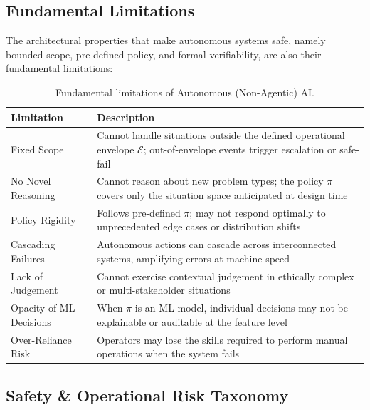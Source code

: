 \documentclass[12pt, a4paper]{article}
\begin{document}
\subsection{Fundamental Limitations}
The architectural properties that make autonomous systems safe, namely bounded scope, pre-defined policy, and formal verifiability, are also their fundamental limitations:

\begin{table}[ht]
\centering
\caption{Fundamental limitations of Autonomous (Non-Agentic) AI.}
\label{tab:limitations}
\begin{tabular}{p{3.5cm}p{9.5cm}}
\toprule
\textbf{Limitation} & \textbf{Description} \\
\midrule
Fixed Scope & Cannot handle situations outside the defined operational envelope $\mathcal{E}$; out-of-envelope events trigger escalation or safe-fail \\
No Novel Reasoning & Cannot reason about new problem types; the policy $\pi$ covers only the situation space anticipated at design time \\
Policy Rigidity & Follows pre-defined $\pi$; may not respond optimally to unprecedented edge cases or distribution shifts \\
Cascading Failures & Autonomous actions can cascade across interconnected systems, amplifying errors at machine speed \\
Lack of Judgement & Cannot exercise contextual judgement in ethically complex or multi-stakeholder situations \\
Opacity of ML Decisions & When $\pi$ is an ML model, individual decisions may not be explainable or auditable at the feature level \\
Over-Reliance Risk & Operators may lose the skills required to perform manual operations when the system fails \\
\bottomrule
\end{tabular}
\end{table}

\subsection{Safety \& Operational Risk Taxonomy}
\end{document}
